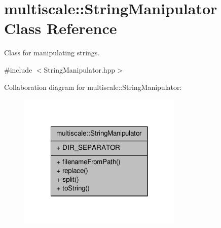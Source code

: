 \hypertarget{classmultiscale_1_1StringManipulator}{\section{multiscale\-:\-:String\-Manipulator Class Reference}
\label{classmultiscale_1_1StringManipulator}
}


Class for manipulating strings.  




{\ttfamily \#include $<$String\-Manipulator.\-hpp$>$}



Collaboration diagram for multiscale\-:\-:String\-Manipulator\-:\nopagebreak
\begin{figure}[H]
\begin{center}
\leavevmode
\includegraphics[width=222pt]{classmultiscale_1_1StringManipulator__coll__graph}
\end{center}
\end{figure}
